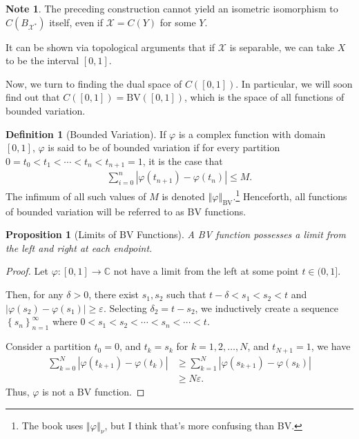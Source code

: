 \documentclass[10pt]{extarticle}
\newcommand{\C}{\mathbb{C}}
\newcommand{\norm}[1]{\left\Vert #1\right\Vert}
\newcommand{\set}[1]{\left\{#1\right\}}
\newcommand{\ve}{\varepsilon}
\theoremstyle{plain}
\newtheorem*{proposition}{Proposition}
\theoremstyle{definition}
\newtheorem*{definition}{Definition}
\theoremstyle{note}
\newtheorem*{note}{Note}
\renewcommand{\newline}{\hfill\break}
\begin{document}
\begin{note}
  The preceding construction cannot yield an isometric isomorphism to $C\left(B_{\mathcal{X}^{\ast}}\right)$ itself, even if $\mathcal{X} = C(Y)$ for some $Y$.\newline

  It can be shown via topological arguments that if $\mathcal{X}$ is separable, we can take $X$ to be the interval $[0,1]$.
\end{note}
Now, we turn to finding the dual space of $C([0,1])$. In particular, we will soon find out that $C([0,1]) = \text{BV}([0,1])$, which is the space of all functions of bounded variation.
\begin{definition}[Bounded Variation]
  If $\varphi$ is a complex function with domain $[0,1]$, $\varphi$ is said to be of bounded variation if for every partition $0 = t_0 < t_1 < \cdots < t_{n} < t_{n+1} = 1$, it is the case that
  \begin{align*}
    \sum_{i=0}^{n}\left\vert \varphi\left(t_{n+1}\right) - \varphi\left(t_{n}\right) \right\vert \leq M.
  \end{align*}
  The infimum of all such values of $M$ is denoted $\norm{\varphi}_{\text{BV}}$.\footnote{The book uses $\norm{\varphi}_{\nu}$, but I think that's more confusing than BV.} Henceforth, all functions of bounded variation will be referred to as BV functions.
\end{definition}
\begin{proposition}[Limits of BV Functions]
  A BV function possesses a limit from the left and right at each endpoint.
\end{proposition}
\begin{proof}
  Let $\varphi: [0,1]\rightarrow \C$ not have a limit from the left at some point $t\in (0,1]$.\newline

  Then, for any $\delta > 0$, there exist $s_1,s_2$ such that $t-\delta < s_1 < s_2 < t$ and $\left\vert \varphi(s_2) - \varphi(s_1) \right\vert \geq \ve$. Selecting $\delta_2 = t - s_2$, we inductively create a sequence $\set{s_n}_{n = 1}^{\infty}$ where $0 < s_1 < s_2 < \cdots < s_n < \cdots < t$.\newline

  Consider a partition $t_0 = 0$, and $t_k= s_k$ for $k = 1,2,\dots,N $, and $t_{N+1} = 1$, we have
  \begin{align*}
    \sum_{k=0}^{N}\left\vert \varphi(t_{k+1}) - \varphi(t_k) \right\vert &\geq \sum_{k=1}^{N}\left\vert \varphi(s_{k+1}) - \varphi(s_{k}) \right\vert\\
                                                                         &\geq N\varepsilon.
  \end{align*}
  Thus, $\varphi$ is not a BV function.
\end{proof}
\end{document}
